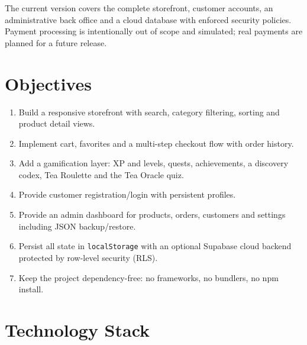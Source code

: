 \documentclass[11pt,a4paper]{article}
\begin{document}
The current version covers the complete storefront, customer accounts, an
administrative back office and a cloud database with enforced security
policies. Payment processing is intentionally out of scope and simulated;
real payments are planned for a future release.


\section{Objectives}

\begin{enumerate}[nosep]
    \item Build a responsive storefront with search, category filtering,
          sorting and product detail views.
    \item Implement cart, favorites and a multi-step checkout flow with
          order history.
    \item Add a gamification layer: XP and levels, quests, achievements,
          a discovery codex, Tea Roulette and the Tea Oracle quiz.
    \item Provide customer registration/login with persistent profiles.
    \item Provide an admin dashboard for products, orders, customers and
          settings including JSON backup/restore.
    \item Persist all state in \texttt{localStorage} with an optional
          Supabase cloud backend protected by row-level security (RLS).
    \item Keep the project dependency-free: no frameworks, no bundlers,
          no npm install.
\end{enumerate}


\section{Technology Stack}
\end{document}
